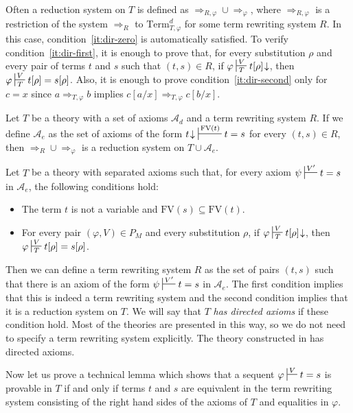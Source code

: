 \documentclass[reqno]{amsart}
\theoremstyle{definition}
\theoremstyle{remark}
\newcommand{\Term}{\mathrm{Term}}
\newcommand{\FV}{\mathrm{FV}}
\numberwithin{figure}{section}
\begin{document}
\begin{remark}
Often a reduction system on $T$ is defined as $\Rightarrow_{R,\varphi} \cup \Rightarrow_\varphi$,
where $\Rightarrow_{R,\varphi}$ is a restriction of the system $\Rightarrow_R$ to $\Term^d_{T,\varphi}$ for some term rewriting system $R$.
In this case, condition~\eqref{it:dir-zero} is automatically satisfied.
To verify condition~\eqref{it:dir-first}, it is enough to prove that, for every substitution $\rho$ and every pair of terms $t$ and $s$ such that $(t,s) \in R$,
if $\varphi \sststile{T}{V} t[\rho]\!\downarrow$, then $\varphi \sststile{T}{V} t[\rho] = s[\rho]$.
Also, it is enough to prove condition~\eqref{it:dir-second} only for $c = x$ since $a \Rightarrow_{T,\varphi} b$ implies $c[a/x] \Rightarrow_{T,\varphi} c[b/x]$.
\end{remark}

\begin{example}[dir-ax]
Let $T$ be a theory with a set of axioms $\mathcal{A}_d$ and a term rewriting system $R$.
If we define $\mathcal{A}_e$ as the set of axioms of the form $t\!\downarrow\ \sststile{}{\FV(t)} t = s$ for every $(t,s) \in R$,
then $\Rightarrow_R \cup \Rightarrow_\varphi$ is a reduction system on $T \cup \mathcal{A}_e$.
\end{example}

Let $T$ be a theory with separated axioms such that, for every axiom $\psi \sststile{}{V'} t = s$ in $\mathcal{A}_e$, the following conditions hold:
\begin{itemize}
\item The term $t$ is not a variable and $\FV(s) \subseteq \FV(t)$.
\item For every pair $(\varphi,V) \in P_M$ and every substitution $\rho$, if $\varphi \sststile{T}{V} t[\rho]\!\downarrow$, then $\varphi \sststile{T}{V} t[\rho] = s[\rho]$.
\end{itemize}
Then we can define a term rewriting system $R$ as the set of pairs $(t,s)$ such that there is an axiom of the form $\psi \sststile{}{V'} t = s$ in $\mathcal{A}_e$.
The first condition implies that this is indeed a term rewriting system and the second condition implies that it is a reduction system on $T$.
We will say that $T$ \emph{has directed axioms} if these condition hold.
Most of the theories are presented in this way, so we do not need to specify a term rewriting system explicitly.
The theory constructed in  has directed axioms.

Now let us prove a technical lemma which shows that a sequent $\varphi \sststile{}{V} t = s$ is provable in $T$ if and only if
terms $t$ and $s$ are equivalent in the term rewriting system consisting of the right hand sides of the axioms of $T$ and equalities in $\varphi$.
\end{document}
